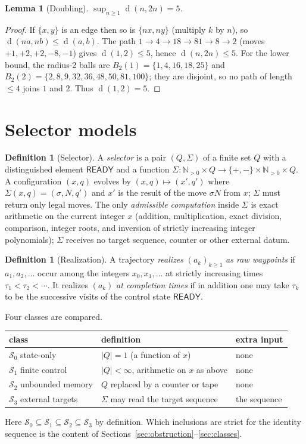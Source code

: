\documentclass[11pt]{article}
\newtheorem{lemma}[theorem]{Lemma}
\theoremstyle{definition}
\newtheorem{definition}[theorem]{Definition}
\newcommand{\N}{\mathbb{N}}
\newcommand{\dist}{\operatorname{d}}
\newcommand{\RDY}{\mathsf{READY}}
\begin{document}
\begin{lemma}[Doubling]\label{lem:doubling}
$\sup_{n\ge1}\dist(n,2n)=5$.
\end{lemma}
\begin{proof} If $\{x,y\}$ is an edge then so is $\{nx,ny\}$ (multiply $k$ by $n$), so $\dist(na,nb)\le\dist(a,b)$. The path
$1\to4\to18\to81\to8\to2$ (moves $+1,+2,+2,-8,-1$) gives $\dist(1,2)\le5$, hence $\dist(n,2n)\le5$.
For the lower bound, the radius-2 balls are $B_2(1)=\{1,4,16,18,25\}$ and $B_2(2)=\{2,8,9,32,36,48,50,81,100\}$;
they are disjoint, so no path of length $\le4$ joins $1$ and $2$. Thus $\dist(1,2)=5$. \end{proof}

\section{Selector models}\label{sec:models}
\begin{definition}[Selector]\label{def:selector}
A \emph{selector} is a pair $(Q,\Sigma)$ of a finite set $Q$ with a distinguished element $\RDY$ and a function
$\Sigma:\N_{>0}\times Q\to\{+,-\}\times\N_{>0}\times Q$. A configuration $(x,q)$ evolves by $(x,q)\mapsto(x',q')$ where
$\Sigma(x,q)=(\sigma,N,q')$ and $x'$ is the result of the move $\sigma N$ from $x$; $\Sigma$ must return only legal moves. The only
\emph{admissible computation} inside $\Sigma$ is exact arithmetic on the current integer $x$ (addition, multiplication, exact division, comparison, integer
roots, and inversion of strictly increasing integer polynomials); $\Sigma$ receives no target sequence, counter or other external datum.
\end{definition}
\begin{definition}[Realization]\label{def:real}
A trajectory \emph{realizes} $(a_k)_{k\ge1}$ \emph{as raw waypoints} if $a_1,a_2,\dots$ occur among the integers $x_0,x_1,\dots$ at
strictly increasing times $\tau_1<\tau_2<\cdots$. It realizes $(a_k)$ \emph{at completion times} if in addition one may take
$\tau_k$ to be the successive visits of the control state $\RDY$.
\end{definition}
Four classes are compared.
\begin{center}\small
\begin{tabular}{@{}lll@{}}\toprule
class & definition & extra input\\\midrule
$\mathcal S_0$ state-only & $|Q|=1$ (a function of $x$) & none\\
$\mathcal S_1$ finite control & $|Q|<\infty$, arithmetic on $x$ as above & none\\
$\mathcal S_2$ unbounded memory & $Q$ replaced by a counter or tape & none\\
$\mathcal S_3$ external targets & $\Sigma$ may read the target sequence & the sequence\\\bottomrule
\end{tabular}
\end{center}
Here $\mathcal S_0\subseteq\mathcal S_1\subseteq\mathcal S_2\subseteq\mathcal S_3$ by definition. Which inclusions are strict for the identity sequence is the content of
Sections~\ref{sec:obstruction}--\ref{sec:classes}.
\end{document}
